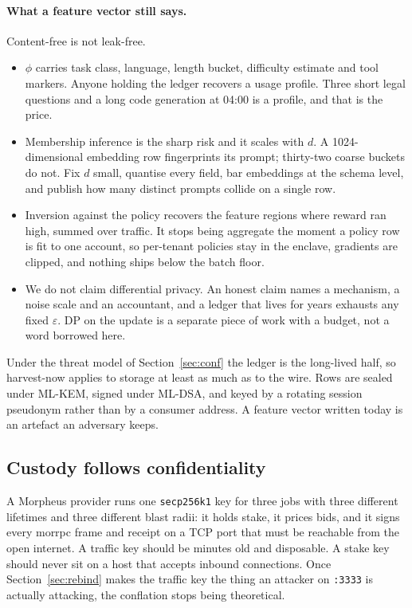 \documentclass[11pt,a4paper]{article}
\newcommand{\code}[1]{\texttt{\small #1}}
\begin{document}
\paragraph{What a feature vector still says.} Content-free is not leak-free.

\begin{itemize}
\item $\phi$ carries task class, language, length bucket, difficulty estimate
and tool markers. Anyone holding the ledger recovers a usage profile. Three
short legal questions and a long code generation at 04:00 is a profile, and that
is the price.
\item Membership inference is the sharp risk and it scales with $d$. A
1024-dimensional embedding row fingerprints its prompt; thirty-two coarse
buckets do not. Fix $d$ small, quantise every field, bar embeddings at the
schema level, and publish how many distinct prompts collide on a single row.
\item Inversion against the policy recovers the feature regions where reward ran
high, summed over traffic. It stops being aggregate the moment a policy row is
fit to one account, so per-tenant policies stay in the enclave, gradients are
clipped, and nothing ships below the batch floor.
\item We do not claim differential privacy. An honest claim names a mechanism, a
noise scale and an accountant, and a ledger that lives for years exhausts any
fixed $\varepsilon$. DP on the update is a separate piece of work with a budget,
not a word borrowed here.
\end{itemize}

Under the threat model of Section~\ref{sec:conf} the ledger is the long-lived
half, so harvest-now applies to storage at least as much as to the wire. Rows
are sealed under ML-KEM, signed under ML-DSA, and keyed by a rotating session
pseudonym rather than by a consumer address. A feature vector written today is
an artefact an adversary keeps.

\subsection{Custody follows confidentiality}
\label{sec:custody}

A Morpheus provider runs one \code{secp256k1} key for three jobs with three
different lifetimes and three different blast radii: it holds stake, it prices
bids, and it signs every morrpc frame and receipt on a TCP port that must be
reachable from the open internet. A traffic key should be minutes old and
disposable. A stake key should never sit on a host that accepts inbound
connections. Once Section~\ref{sec:rebind} makes the traffic key the thing an
attacker on \code{:3333} is actually attacking, the conflation stops being
theoretical.
\end{document}
